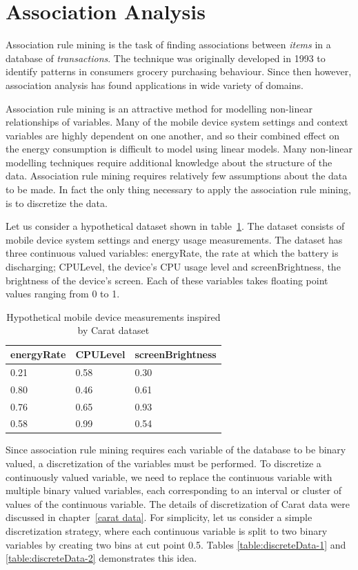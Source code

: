\section{Association Analysis} \label{association analysis}

Association rule mining is the task of finding associations between \textit{items} in a database of \textit{transactions}. The technique was originally developed in 1993 to identify patterns in consumers grocery purchasing behaviour. Since then however, association analysis has found applications in wide variety of domains.

Association rule mining is an attractive method for modelling non-linear relationships of variables. Many of the mobile device system settings and context variables are highly dependent on one another, and so their combined effect on the energy consumption is difficult to model using linear models. Many non-linear modelling techniques require additional knowledge about the structure of the data. Association rule mining requires relatively few assumptions about the data to be made. In fact the only thing necessary to apply the association rule mining, is to discretize the data.    

Let us consider a hypothetical dataset shown in table~\ref{table:raw-data}. The dataset consists of mobile device system settings and energy usage measurements. The dataset has three continuous valued variables:  energyRate, the rate at which the battery is discharging;  CPULevel, the device's CPU usage level and screenBrightness, the brightness of the device's screen. Each of these variables takes floating point values ranging from 0 to 1.
\begin{table} %
    \begin{tabular}{ | l | l | l | }
    \hline
    \textbf{energyRate} & \textbf{CPULevel} & \textbf{screenBrightness} \\ \hline
    0.21 & 0.58 & 0.30 \\ \hline 
    0.80 & 0.46 & 0.61 \\ \hline 
    0.76 & 0.65 & 0.93 \\ \hline 
    0.58 & 0.99 & 0.54 \\ \hline 
    \end{tabular}
	\caption{Hypothetical mobile device measurements inspired by Carat dataset}
	\label{table:raw-data}
\end{table}

Since association rule mining requires each variable of the database to be binary valued, a discretization of the variables must be performed. To discretize a continuously valued variable, we need to replace the continuous variable with multiple binary valued variables, each corresponding to an interval or cluster of values of the continuous variable. The details of discretization of Carat data were discussed in chapter~\ref{carat data}. For simplicity, let us consider a simple discretization strategy, where each continuous variable is split to two binary variables by creating two bins at cut point 0.5. Tables \ref{table:discreteData-1} and \ref{table:discreteData-2} demonstrates this idea.

